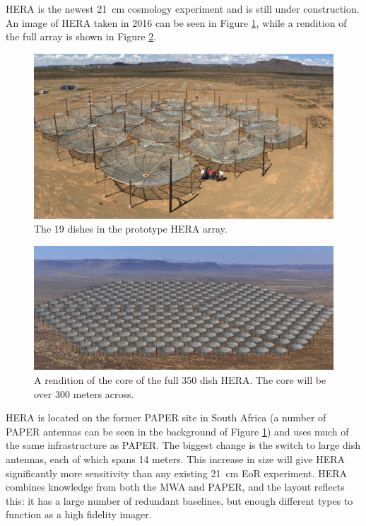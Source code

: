 HERA is the newest 21\ cm cosmology experiment and is still under construction.  An
image of HERA taken in 2016 can be seen in Figure
\ref{fig:hera}, while a rendition of the full array is shown in Figure \ref{fig:hera_render}.
\begin{figure}[htbp!]
\centering
\includegraphics[width=4.5in]{figures/HERA.png}
\caption{The 19 dishes in the prototype HERA array.}
\label{fig:hera}
\end{figure}
\begin{figure}[htbp!]
\centering
\includegraphics[width=4.5in]{figures/hera_render.png}
\caption{A rendition of the core of the full 350 dish HERA.  The core will be over 300 meters
across.}
\label{fig:hera_render}
\end{figure}
HERA is located on the former PAPER site in South Africa (a number of PAPER antennas can be
seen in the background of Figure \ref{fig:hera}) and uses much of the same infrastructure as
PAPER.  The biggest change is the switch to large dish antennas, each of which spans 14 meters.  This
increase in size will give HERA significantly more sensitivity than any existing 21\ cm EoR
experiment.  HERA combines knowledge from both the MWA and PAPER, and the layout reflects this:
it has a large number of redundant baselines, but enough different types to function as a high
fidelity imager. 
